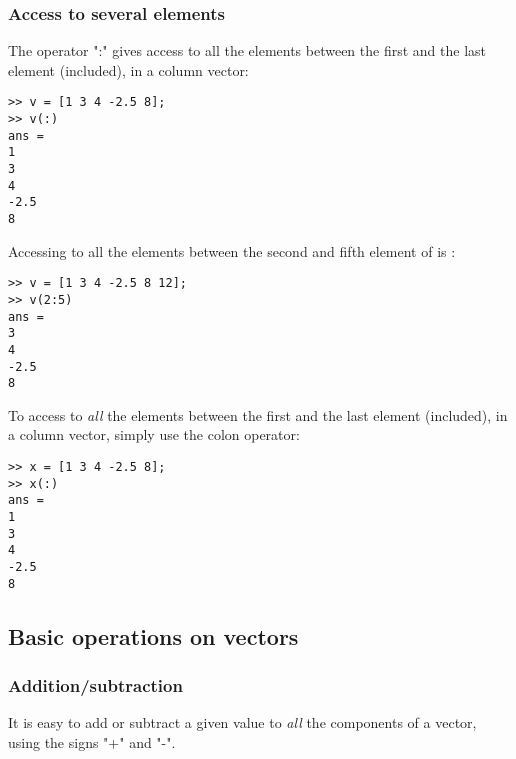 \subsubsection{Access to several elements}

The operator ":" gives access to all the elements between the first and the last element (included), in a column vector:

\begin{lstlisting}
>> v = [1 3 4 -2.5 8];
>> v(:)
ans = 
1
3
4
-2.5
8
\end{lstlisting}

Accessing to all the elements between the second and fifth element of  is :

\begin{lstlisting}
>> v = [1 3 4 -2.5 8 12];
>> v(2:5)
ans = 
3
4
-2.5
8
\end{lstlisting}
To access to \emph{all} the elements between the first and the last element (included), in a column vector, simply use the colon operator:

\begin{lstlisting}
>> x = [1 3 4 -2.5 8];
>> x(:)
ans = 
1
3
4
-2.5
8
\end{lstlisting}




\subsection{Basic operations on vectors}
\subsubsection{Addition/subtraction}
It is easy to add or subtract a given value to \emph{all} the components of a vector, using the signs "+" and "-".

